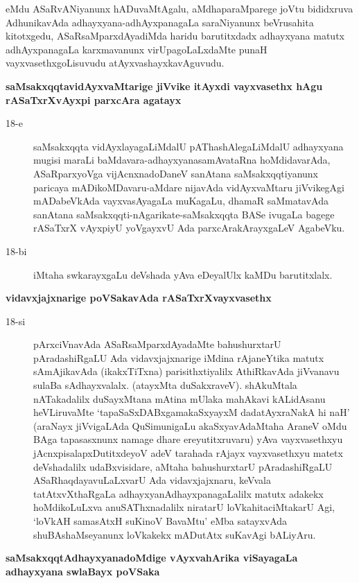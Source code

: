 \noindent
eMdu ASaRvANiyanunx hADuvaMtAgalu, aMdhaparaMparege joVtu bididxruva AdhunikavAda adhayxyana-adhAyxpanagaLa saraNiyanunx beVrusahita kitotxgedu, ASaRsaMparxdAyadiMda haridu barutitxdadx adhayxyana matutx adhAyxpanagaLa karxmavanunx virUpagoLaLxdaMte punaH vayxvasethxgoLisuvudu atAyxvashayxka\-vAgu\-vudu.

{\bigskip
\noindent
{\large\bf saMsakxqqtavidAyxvaMtarige jiVvike itAyxdi vayxvasethx hAgu rASaTxrXvAyxpi parxcAra agatayx}}\label{page46}

\begin{description}
\item[18-e] saMsakxqqta vidAyxlayagaLiMdalU pAThashAlegaLiMdalU adhayxyana mugisi maraLi baMdavara-adhayx\-yana\-samAvataRna hoMdidavarAda, ASaR\break\-parxyoVga vijAcnxnadoDaneV sanAtana saMsakxqqti\-yanunx paricaya mADi\-koMDa\-varu-aMdare nijavAda vidAyxvaMtaru jiVvikegAgi mADabeVkAda vayxva\break\-sAyagaLa muKagaLu, dhamaR saMmatavAda sanAtana saMsakxqqti-nAgarikate\break-saMsakxqqta BASe ivu\-gaLa bagege rASaTxrX vAyxpiyU yoVgayxvU Ada parxcAra\-kArayxgaLeV AgabeVku.

\item[18-bi] iMtaha swkarayxgaLu deVshada yAva eDeyalUlx kaMDu barutitxlalx.
\end{description}
\noindent
{\large\bf vidavxjajxnarige poVSakavAda rASaTxrXvayxvasethx}\label{page46}
\begin{description}
\item[18-si] pArxciVnavAda ASaRsaMparxdAyadaMte bahushurxtarU pAradashiRgaLU Ada vidavxjajxnarige iMdina\- rAjaneYtika matutx sAmAjikavAda (ikakxTiTxna) parisithxti\-yalilx AthiRkavAda jiVvanavu sulaBa sAdhayx\-valalx. (atayxMta duSakxraveV). shAkuMtala nATakadalilx duSayxMtana mAtina mUlaka mahAkavi kALi\-dAsanu heVLiruvaMte `tapaSaSxDABxgamakaSxyayxM\label{46} dadatAyxraNakA hi naH' (araNayx jiVvi\-gaLAda QuSi\-muni\-gaLu akaSxyavAdaMtaha AraneV oMdu BAga tapasasxnunx namage dhare ereyutitxruvaru) yAva vayxvasethxyu jAcnxpisalapxDutitxdeyoV adeV tarahada rAjayx vayxvasethxyu matetx deVshadalilx udaBxvisidare, aMtaha bahushurxtarU pAradashiRgaLU ASaRhaqdayavuLaLxvarU Ada vidavxjajxnaru, keVvala tatAtxvX\-thaRgaLa adhayxyanAdhayxpanagaLalilx matutx adakekx hoMdikoLuLxva anuSAThxnadalilx niratarU loVkahita\-ciMtakarU Agi, `loVkAH samasAtxH suKinoV BavaMtu'\label{47} eMba satayxvAda shuBAshaMseyanunx loVkakekx mADutAtx suKavAgi bALiyAru.
\end{description}
{\noindent
{\large\bf saMsakxqqtAdhayxyanadoMdige vAyxvahArika viSayagaLa adhayxyana swlaBayx poVSaka}}\label{page47}
